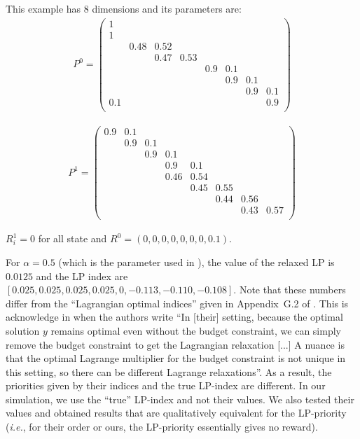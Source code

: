 This example has $8$ dimensions and its parameters are:
\begin{align*}
    P^{ 0 }=\left(
    \begin{array}{cccccccc}
       1 & & & & & & & \\
       1 & & & & & & & \\
        &0.48 &0.52 & & & & & \\
        & &0.47 &0.53 & & & & \\
        & & & &0.9 &0.1 & & \\
        & & & & &0.9 &0.1 & \\
        & & & & & &0.9 &0.1 \\
       0.1 & & & & & & &0.9 \\
    \end{array}\right)
\end{align*}

\begin{align*}
    P^{ 1 }=\left(
    \begin{array}{cccccccc}
       0.9 &0.1 & & & & & & \\
        &0.9 &0.1 & & & & & \\
        & &0.9 &0.1 & & & & \\
        & & &0.9 &0.1 & & & \\
        & & &0.46 &0.54 & & & \\
        & & & &0.45 &0.55 & & \\
        & & & & &0.44 &0.56 & \\
        & & & & & &0.43 &0.57 \\
    \end{array}\right)
\end{align*}

$R^{ 1 }_i = 0 $ for all state and $R^{ 0 } =  (0, 0,0 ,0 ,0 ,0 ,0 ,0.1)$.

For $\alpha=0.5$ (which is the parameter used in \cite{HXCW23}), the value of the relaxed LP is $0.0125$ and the LP index are $[0.025 , 0.025 , 0.025 , 0.025 , 0 , -0.113 , -0.110 , -0.108]$. Note that these numbers differ from the ``Lagrangian optimal indices'' given in Appendix~G.2 of \cite{HXCW23}. This is acknowledge in \cite{HXCW23} when the authors write ``In [their] setting, because the optimal solution $y$ remains optimal even without the budget constraint, we can simply remove the budget constraint to get the Lagrangian relaxation [...] A nuance is that the optimal Lagrange multiplier for the budget constraint is not unique in this setting, so there can be different Lagrange relaxations''. As a result, the priorities given by their indices and the true LP-index are different. In our simulation, we use the ``true'' LP-index and not their values. We also tested their values and obtained results that are qualitatively equivalent for the LP-priority (\emph{i.e.}, for their order or ours, the LP-priority essentially gives no reward).

